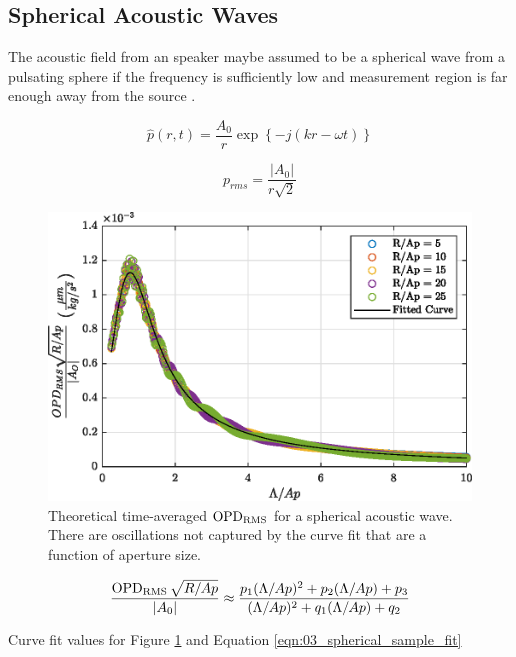 \subsection{Spherical Acoustic Waves}
The acoustic field from an speaker maybe assumed to be a spherical wave from a pulsating sphere if the frequency is sufficiently low and measurement region is far enough away from the source \cite{Randall-1951-9NtPPXPq}.

\begin{equation}
  \hat{p}(r,t) = \frac{A_0}{r}\exp\left\{-j(kr-\omega t)\right\}
  \label{eqn:03_spherical_pressure}
\end{equation}

\begin{equation}
  p_{rms} = \frac{|A_0|}{r\sqrt{2}}
  \label{eqn:03_spherical_pressure_rms}
\end{equation}

\begin{figure}
  \centering
  \includegraphics{../matlab/03_aero_optics_acoustics/spherical_sample.eps}
  \caption{Theoretical time-averaged $\operatorname{OPD_{RMS}}$ for a spherical acoustic wave. There are oscillations not captured by the curve fit that are a function of aperture size.}
  \label{fig:03_spherical_sample}
\end{figure}

\begin{equation}
  \frac{\operatorname{OPD_{RMS}}\sqrt{R/Ap}}{|A_0|} \approx \frac{p_1(\Lambda/Ap)^2+p_2(\Lambda/Ap)+p_3}{(\Lambda/Ap)^2+q_1(\Lambda/Ap)+q_2}
  \label{eqn:03_spherical_sample_fit}
\end{equation}


\begin{table}
\centering
\caption{Curve fit values for Figure \ref{fig:03_spherical_sample} and Equation \ref{eqn:03_spherical_sample_fit}}

\label{tab:03_speherical_sample_coeff}
\end{table}

